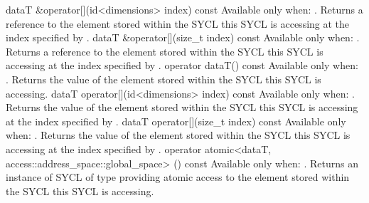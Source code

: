   \addRow
    { dataT \&operator[](id<dimensions> index) const }
    {
      Available only when: .
      \newline
      Returns a reference to the element stored within the SYCL  this SYCL  is accessing at the index
      specified by .
    }
  \addRow
    { dataT \&operator[](size_t index) const }
    {
      Available only when: .
      \newline
      Returns a reference to the element stored within the SYCL  this SYCL  is accessing at the index
      specified by .
    }
  \addRow
    { operator dataT() const }
    {
      Available only when: .
      \newline
      Returns the value of the element stored within the SYCL  this SYCL  is accessing.
    }
  \addRow
    { dataT operator[](id<dimensions> index) const }
    {
      Available only when: .
      \newline
      Returns the value of the element stored within the SYCL  this SYCL  is accessing at the index
      specified by .
    }
  \addRow
    { dataT operator[](size_t index) const }
    {
      Available only when: .
      \newline
      Returns the value of the element stored within the SYCL  this SYCL  is accessing at the index
      specified by .
    }    
  \addRowTwoL
    { operator atomic<dataT, }
    { access::address_space::global_space> () const }
    {
      Available only when: .
      \newline
      Returns an instance of SYCL  of type 
      providing atomic access to the element stored within the SYCL  this SYCL  is accessing.
    }

